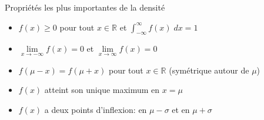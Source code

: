 \documentclass{BeamerTemplate}
\begin{document}
\begin{frame}[t]{Propriétés les plus importantes de la densité}
\begin{itemize}\itemsep 5mm
\item $f(x)\ge0$ pour tout $x\in\mathbb{R}$ et $\int_{-\infty}^\infty f(x)\;dx=1$
\item $\lim\limits_{x\to -\infty}f(x)=0$ et $\lim\limits_{x\to\infty}f(x)=0$
\item $f(\mu-x)=f(\mu+x)$ pour tout $x\in\mathbb{R}$  \alert{(symétrique autour de $\mu$)}
\item $f(x)$ atteint son unique maximum en $x=\mu$
\item $f(x)$ a deux points d'inflexion:  en \alert{$\mu-\sigma$} et  en \alert{$\mu+\sigma$}

\end{itemize}
\end{frame}

\end{document}

